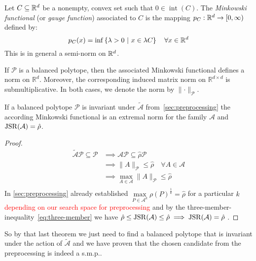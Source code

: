 \begin{definition}
    Let $C \subseteq \mathbb{R}^d$ be a nonempty, convex set such that $0 \in \operatorname{int}(C)$.
    The \emph{Minkowski functional} (or \emph{gauge function}) associated to $C$ is the mapping $p_C : \mathbb{R}^d \to [0,\infty)$ defined by:
    \[
    p_C(x) = \inf\left\{ \lambda > 0 \ \middle| \ x \in \lambda C \right\} \quad \forall x \in \mathbb{R}^d
    \]
    This is in general a semi-norm on $\mathbb{R}^d$.

\end{definition}

\begin{remark}
    If $\mathcal{P}$ is a balanced polytope, then the associated Minkowski functional defines a norm on $\mathbb{R}^d$. Moreover, the corresponding induced matrix norm on $\mathbb{R}^{d \times d}$ is submultiplicative. In both cases, we denote the norm by $\lVert \cdot \rVert _{\mathcal{P}}$.
\end{remark}

\begin{theorem}
    If a balanced polytope $\mathcal{P}$ is invariant under $\tilde{\mathcal{A}}$ from~\eqref{sec:preprocessing}
    the according Minkowski functional is an extremal norm for the family $\mathcal{A}$ and $ \operatorname{JSR}(\mathcal{A}) = \hat{\rho}$.
\end{theorem}

\begin{proof}
    \vspace{\baselineskip}
    $$
    \begin{aligned}
    \tilde{\mathcal{A}}\mathcal{P} \subseteq  \mathcal{P} & \implies \mathcal{A}\mathcal{P} \subseteq \hat{\rho}\mathcal{P} \\
    & \implies \lVert A \rVert _\mathcal{P} \le \hat{\rho} \quad \forall A \in \mathcal{A} \\
    & \implies \max \limits_{A \in \mathcal{A}} \lVert A \rVert _\mathcal{P} \le \hat{\rho} \\
    \end{aligned}
    $$
    In \ref{sec:preprocessing} already established $\max \limits_{P \in \mathcal{A}^{k}} \rho(P)^{\frac{1}{k}} = \hat{\rho}$ for a particular $k$ \textcolor{red}{depending on our search space for preprocessing}
    and by the three-member-inequality~\eqref{eq:three-member} we have $ \hat{\rho} \le \operatorname{JSR}(\mathcal{A}) \le \hat{\rho} \implies \operatorname{JSR}(\mathcal{A}) = \hat{\rho}$ .
\end{proof}
So by that last theorem we just need to find a balanced polytope that is invariant under the action of $\tilde{\mathcal{A}}$ and we have proven that the chosen candidate from the preprocessing is indeed a s.m.p..

